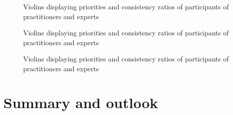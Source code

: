 \documentclass [oneside,10pt,a4paper,ngerman,BCOR10mm,headsepline,parindent,final]{scrartcl}
\makeatletter
\newcommand{\boxspacing}{\kern\kvtcb@left@rule\kern\kvtcb@boxsep}
\newcommand{\prompt}[4]{
        {\ttfamily\llap{{\color{#2}[#3]:\hspace{3pt}#4}}\vspace{-\baselineskip}}
    }
\makeatother
\begin{document}
    \begin{figure}
        \begin{center}\end{center}
        \caption{Violins displaying priorities and consistency ratios of participants of practitioners and experts}
        \label{fig:violins_all_attributes}
    \end{figure}
    
    \begin{figure}
        \begin{center}\end{center}
        \caption{Violins displaying priorities and consistency ratios of participants of practitioners and experts}
        \label{fig:violins_all_attributes}
    \end{figure}
    
    \begin{figure}
        \begin{center}\end{center}
        \caption{Violins displaying priorities and consistency ratios of participants of practitioners and experts}
        \label{fig:violins_all_attributes}
    \end{figure}
    
    \hypertarget{summary-and-outlook}{%
\section{Summary and outlook}\label{summary-and-outlook}}

    \begin{tcolorbox}[breakable, size=fbox, boxrule=1pt, pad at break*=1mm,colback=cellbackground, colframe=cellborder]
\prompt{In}{incolor}{ }{\boxspacing}
\begin{Verbatim}[commandchars=\\\{\}]

\end{Verbatim}
\end{tcolorbox}


    
    
    \printbibheading[heading=bibnumbered]
    \printbibliography[heading=subbibliography,keyword={URL},title={Online references}]
    \printbibliography[heading=subbibliography,keyword={book},title={Books, technical reports and others}]
    
\end{document}
